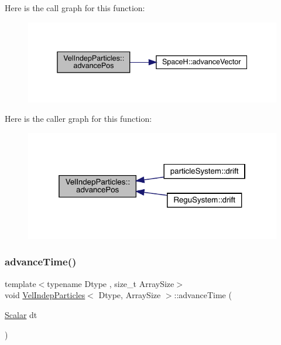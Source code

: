 Here is the call graph for this function\+:\nopagebreak
\begin{figure}[H]
\begin{center}
\leavevmode
\includegraphics[width=338pt]{class_vel_indep_particles_aff530f9e2dbd6dc053e251caa07464ad_cgraph}
\end{center}
\end{figure}
Here is the caller graph for this function\+:\nopagebreak
\begin{figure}[H]
\begin{center}
\leavevmode
\includegraphics[width=319pt]{class_vel_indep_particles_aff530f9e2dbd6dc053e251caa07464ad_icgraph}
\end{center}
\end{figure}
\mbox{\label{class_vel_indep_particles_a024d302cca3027451619a9346ecc24a4}} 
\subsubsection{\texorpdfstring{advance\+Time()}{advanceTime()}}
{\footnotesize\ttfamily template$<$typename Dtype , size\+\_\+t Array\+Size$>$ \\
void \mbox{\hyperlink{class_vel_indep_particles}{Vel\+Indep\+Particles}}$<$ Dtype, Array\+Size $>$\+::advance\+Time (\begin{DoxyParamCaption}\item[{\mbox{\hyperlink{class_vel_indep_particles_a5d275b22f0d759f360ddd80e78f4b466}{Scalar}}}]{dt }\end{DoxyParamCaption})\hspace{0.3cm}{\ttfamily [inline]}}



